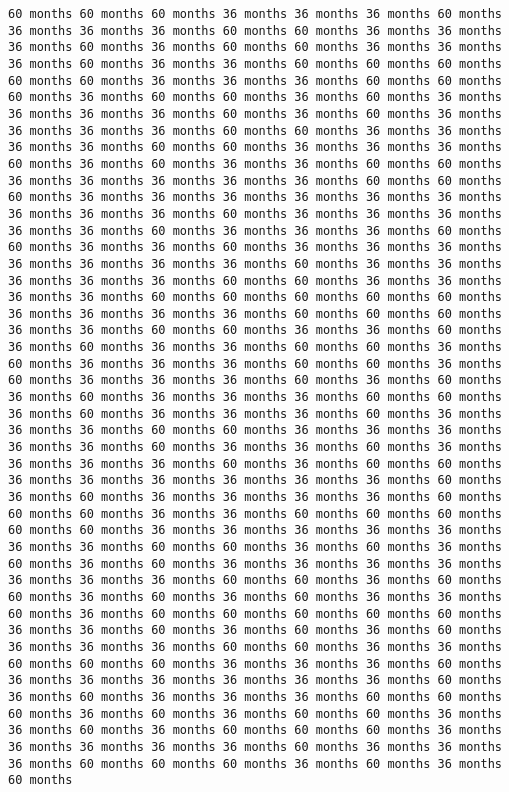 \documentclass[11pt]{article}
\begin{document}
\begin{Verbatim}[commandchars=\\\{\}, frame=single, framerule=2mm, rulecolor=\color{outerrorbackground}]
60 months 60 months 60 months 36 months 36 months 36 months 60 months 36 months 36 months 36 months 60 months 60 months 36 months 36 months 36 months 60 months 36 months 60 months 60 months 36 months 36 months 36 months 60 months 36 months 36 months 60 months 60 months 60 months 60 months 60 months 36 months 36 months 36 months 60 months 60 months 60 months 36 months 60 months 60 months 36 months 60 months 36 months 36 months 36 months 36 months 60 months 36 months 60 months 36 months 36 months 36 months 36 months 60 months 60 months 36 months 36 months 36 months 36 months 60 months 60 months 36 months 36 months 36 months 60 months 36 months 60 months 36 months 36 months 60 months 60 months 36 months 36 months 36 months 36 months 36 months 60 months 60 months 60 months 36 months 36 months 36 months 36 months 36 months 36 months 36 months 36 months 36 months 60 months 36 months 36 months 36 months 36 months 36 months 60 months 36 months 36 months 36 months 60 months 60 months 36 months 36 months 60 months 36 months 36 months 36 months 36 months 36 months 36 months 36 months 60 months 36 months 36 months 36 months 36 months 36 months 60 months 60 months 36 months 36 months 36 months 36 months 60 months 60 months 60 months 60 months 60 months 36 months 36 months 36 months 36 months 60 months 60 months 60 months 36 months 36 months 60 months 60 months 36 months 36 months 60 months 36 months 60 months 36 months 36 months 60 months 60 months 36 months 60 months 36 months 36 months 36 months 60 months 60 months 36 months 60 months 36 months 36 months 36 months 60 months 36 months 60 months 36 months 60 months 36 months 36 months 36 months 60 months 60 months 36 months 60 months 36 months 36 months 36 months 60 months 36 months 36 months 36 months 60 months 60 months 36 months 36 months 36 months 36 months 36 months 60 months 36 months 36 months 60 months 36 months 36 months 36 months 36 months 60 months 36 months 60 months 60 months 36 months 36 months 36 months 36 months 36 months 36 months 60 months 36 months 60 months 36 months 36 months 36 months 36 months 60 months 60 months 60 months 36 months 36 months 60 months 60 months 60 months 60 months 60 months 36 months 36 months 36 months 36 months 36 months 36 months 36 months 60 months 60 months 36 months 60 months 36 months 60 months 36 months 60 months 36 months 36 months 36 months 36 months 36 months 36 months 36 months 60 months 60 months 36 months 60 months 60 months 36 months 60 months 36 months 60 months 36 months 36 months 60 months 36 months 60 months 60 months 60 months 60 months 60 months 36 months 36 months 60 months 36 months 60 months 36 months 60 months 36 months 36 months 36 months 60 months 60 months 36 months 36 months 60 months 60 months 60 months 36 months 36 months 36 months 60 months 36 months 36 months 36 months 36 months 36 months 36 months 60 months 36 months 60 months 36 months 36 months 36 months 60 months 60 months 60 months 36 months 60 months 36 months 60 months 60 months 36 months 36 months 60 months 36 months 60 months 60 months 60 months 36 months 36 months 36 months 36 months 36 months 60 months 36 months 36 months 36 months 60 months 60 months 60 months 36 months 60 months 36 months 60 months 
\end{Verbatim}
\end{document}
